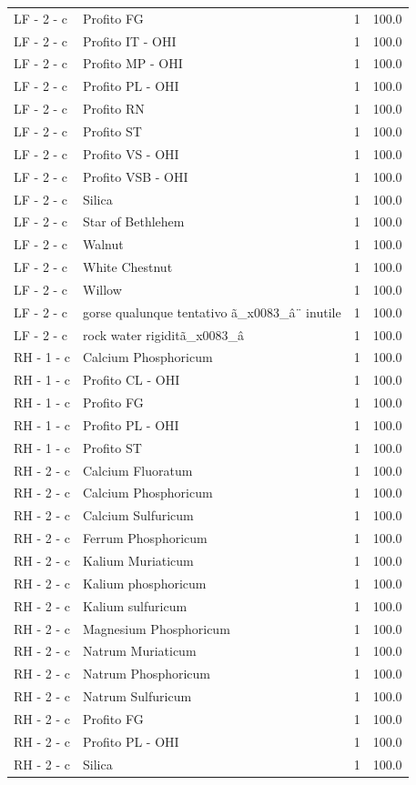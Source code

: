 \documentclass[a4paper,11pt]{article}
\begin{document}
\begin{footnotesize}
\begin{longtable}{p{3.5cm}p{7.5cm}rr}
LF - 2 - c & Profito FG & 1 & 100.0 \\
LF - 2 - c & Profito IT - OHI & 1 & 100.0 \\
LF - 2 - c & Profito MP - OHI & 1 & 100.0 \\
LF - 2 - c & Profito PL - OHI & 1 & 100.0 \\
LF - 2 - c & Profito RN & 1 & 100.0 \\
LF - 2 - c & Profito ST & 1 & 100.0 \\
LF - 2 - c & Profito VS - OHI & 1 & 100.0 \\
LF - 2 - c & Profito VSB - OHI & 1 & 100.0 \\
LF - 2 - c & Silica & 1 & 100.0 \\
LF - 2 - c & Star of Bethlehem & 1 & 100.0 \\
LF - 2 - c & Walnut & 1 & 100.0 \\
LF - 2 - c & White Chestnut & 1 & 100.0 \\
LF - 2 - c & Willow & 1 & 100.0 \\
LF - 2 - c & gorse qualunque tentativo ã\_x0083\_â¨ inutile & 1 & 100.0 \\
LF - 2 - c & rock water rigiditã\_x0083\_â & 1 & 100.0 \\
RH - 1 - c & Calcium Phosphoricum & 1 & 100.0 \\
RH - 1 - c & Profito CL - OHI & 1 & 100.0 \\
RH - 1 - c & Profito FG & 1 & 100.0 \\
RH - 1 - c & Profito PL - OHI & 1 & 100.0 \\
RH - 1 - c & Profito ST & 1 & 100.0 \\
RH - 2 - c & Calcium Fluoratum & 1 & 100.0 \\
RH - 2 - c & Calcium Phosphoricum & 1 & 100.0 \\
RH - 2 - c & Calcium Sulfuricum & 1 & 100.0 \\
RH - 2 - c & Ferrum Phosphoricum & 1 & 100.0 \\
RH - 2 - c & Kalium Muriaticum & 1 & 100.0 \\
RH - 2 - c & Kalium phosphoricum & 1 & 100.0 \\
RH - 2 - c & Kalium sulfuricum & 1 & 100.0 \\
RH - 2 - c & Magnesium Phosphoricum & 1 & 100.0 \\
RH - 2 - c & Natrum Muriaticum & 1 & 100.0 \\
RH - 2 - c & Natrum Phosphoricum & 1 & 100.0 \\
RH - 2 - c & Natrum Sulfuricum & 1 & 100.0 \\
RH - 2 - c & Profito FG & 1 & 100.0 \\
RH - 2 - c & Profito PL - OHI & 1 & 100.0 \\
RH - 2 - c & Silica & 1 & 100.0 \\
\end{longtable}
\end{footnotesize}
\end{document}
